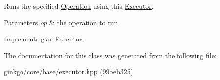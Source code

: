Runs the specified \hyperlink{classgko_1_1Operation}{Operation} using this \hyperlink{classgko_1_1Executor}{Executor}. 


\begin{DoxyParams}{Parameters}
{\em op} & the operation to run \\
\hline
\end{DoxyParams}


Implements \hyperlink{classgko_1_1Executor_a1de8e2668b76e66690acf5eef9e8324d}{gko\+::\+Executor}.



The documentation for this class was generated from the following file\+:\begin{DoxyCompactItemize}
\item 
ginkgo/core/base/executor.\+hpp (99beb325)\end{DoxyCompactItemize}
